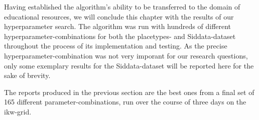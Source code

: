 







\label{sec:results_params}

Having established the algorithm's ability to be transferred to the domain of educational resources, we will conclude this chapter with the results of our hyperparameter search. The algorithm was run with hundreds of different hyperparameter-combinations for both the placetypes- and Siddata-dataset throughout the process of its implementation and testing. As the precise hyperparameter-combination was not very imporant for our research questions, only some exemplary results for the Siddata-dataset will be reported here for the sake of brevity.

The reports produced in the previous section are the best ones from a final set of 165 different parameter-combinations, run over the course of three days on the \gls{ikw}-grid. %



